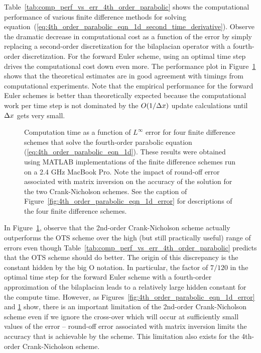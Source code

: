 \documentclass[fleqn,12pt,twoside]{article}
\begin{document}
Table~\ref{tab:comp_perf_vs_err_4th_order_parabolic} shows the computational 
performance of various finite difference methods for solving 
equation~(\ref{eq:4th_order_parabolic_eqn_1d_second_time_derivative}).
Observe the dramatic decrease in computational cost as a function of the
error by simply replacing a second-order discretization for the bilaplacian 
operator with a fourth-order discretization.  For the forward Euler scheme,
using an optimal time step drives the computational cost down even more.
The performance plot in Figure~\ref{fig:4th_order_parabolic_eqn_1d_perf} 
shows that the theoretical estimates are in good agreement with timings 
from computational experiments.  Note that the empirical performance for the 
forward Euler schemes is better than theoretically expected because the 
computational work per time step is not dominated by the 
$O(1/\Delta x)$ update calculations until $\Delta x$ gets very small.

\begin{figure}[tb]
\begin{center}
\caption{Computation time as a function of $L^\infty$ error for four
finite difference schemes that solve the fourth-order parabolic equation
(\ref{eq:4th_order_parabolic_eqn_1d}).  
These results were obtained using MATLAB implementations of the 
finite difference schemes run on a 2.4 GHz MacBook Pro.
Note the impact of round-off error associated with matrix inversion on 
the accuracy of the solution for the two Crank-Nicholson schemes.
See the caption of Figure~\ref{fig:4th_order_parabolic_eqn_1d_error} for 
descriptions of the four finite difference schemes.
}
\label{fig:4th_order_parabolic_eqn_1d_perf}
\end{center}
\end{figure}

In Figure~\ref{fig:4th_order_parabolic_eqn_1d_perf}, observe that the 
2nd-order Crank-Nicholson scheme actually outperforms the OTS scheme over 
the high (but still practically useful) range of errors even though 
Table~\ref{tab:comp_perf_vs_err_4th_order_parabolic} predicts that the OTS
scheme should do better.  The origin of this discrepancy is the constant 
hidden by the big O notation.  In particular, the factor of $7/120$ in 
the optimal time step for the forward Euler scheme with a fourth-order 
approximation of the bilaplacian leads to a relatively large hidden constant 
for the compute time. 
However, as Figures~\ref{fig:4th_order_parabolic_eqn_1d_error} and
\ref{fig:4th_order_parabolic_eqn_1d_perf} show, there is an important 
limitation of the 2nd-order Crank-Nicholson scheme even if we ignore the 
cross-over which will occur at sufficiently small values of the error -- 
round-off error associated with matrix inversion limits the accuracy that is 
achievable by the scheme.  This limitation also exists for the 4th-order 
Crank-Nicholson scheme. 
\end{document}
